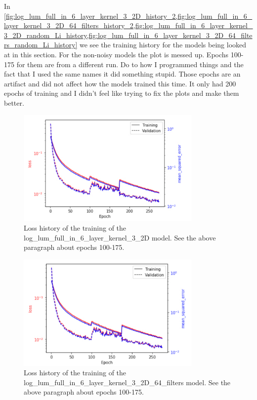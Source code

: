 \documentclass{article}
\begin{document}
		In \cref{fig:log_lum_full_in_6_layer_kernel_3_2D_history_2,fig:log_lum_full_in_6_layer_kernel_3_2D_64_filters_history_2,fig:log_lum_full_in_6_layer_kernel_3_2D_random_Li_history,fig:log_lum_full_in_6_layer_kernel_3_2D_64_filters_random_Li_history} we see the training history for the models being looked at in this section.  For the non-noisy models the plot is messed up.  Epochs 100-175 for them are from a different run.  Do to how I programmed things and the fact that I used the same names it did something stupid.  Those epochs are an artifact and did not affect how the models trained this time.  It only had 200 epochs of training and I didn't feel like trying to fix the plots and make them better.

		\begin{figure}[H]
			\centering
			\includegraphics[width=0.8\textwidth]{log_lum_full_in_6_layer_kernel_3_2D_history_2.pdf}
			\caption{Loss history of the training of the log\_lum\_full\_in\_6\_layer\_kernel\_3\_2D model.  See the above paragraph about epochs 100-175.}
			\label{fig:log_lum_full_in_6_layer_kernel_3_2D_history_2}
		\end{figure}

		\begin{figure}[H]
			\centering
			\includegraphics[width=0.8\textwidth]{log_lum_full_in_6_layer_kernel_3_2D_64_filters_history_2.pdf}
			\caption{Loss history of the training of the log\_lum\_full\_in\_6\_layer\_kernel\_3\_2D\_64\_filters model.  See the above paragraph about epochs 100-175.}
			\label{fig:log_lum_full_in_6_layer_kernel_3_2D_64_filters_history_2}
		\end{figure}
\end{document}
